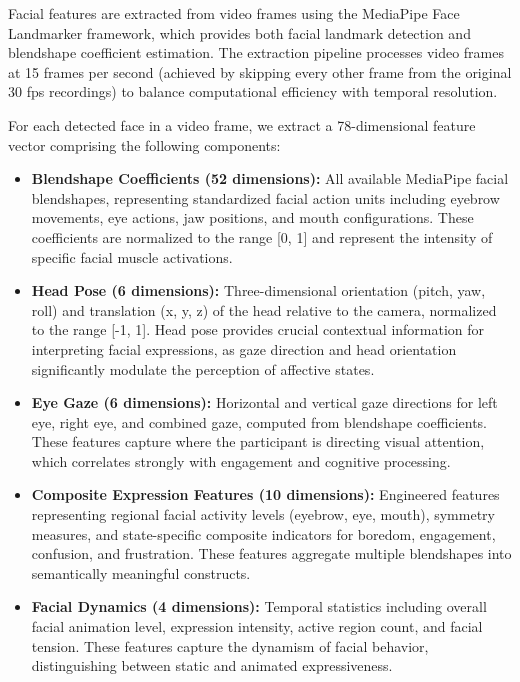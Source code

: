 \documentclass[11pt,a4paper]{article}
\begin{document}
Facial features are extracted from video frames using the MediaPipe Face Landmarker framework, which provides both facial landmark detection and blendshape coefficient estimation. The extraction pipeline processes video frames at 15 frames per second (achieved by skipping every other frame from the original 30 fps recordings) to balance computational efficiency with temporal resolution.

For each detected face in a video frame, we extract a 78-dimensional feature vector comprising the following components:

\begin{itemize}
  \item \textbf{Blendshape Coefficients (52 dimensions):} All available MediaPipe facial blendshapes, representing standardized facial action units including eyebrow movements, eye actions, jaw positions, and mouth configurations. These coefficients are normalized to the range [0, 1] and represent the intensity of specific facial muscle activations.

  \item \textbf{Head Pose (6 dimensions):} Three-dimensional orientation (pitch, yaw, roll) and translation (x, y, z) of the head relative to the camera, normalized to the range [-1, 1]. Head pose provides crucial contextual information for interpreting facial expressions, as gaze direction and head orientation significantly modulate the perception of affective states.

  \item \textbf{Eye Gaze (6 dimensions):} Horizontal and vertical gaze directions for left eye, right eye, and combined gaze, computed from blendshape coefficients. These features capture where the participant is directing visual attention, which correlates strongly with engagement and cognitive processing.

  \item \textbf{Composite Expression Features (10 dimensions):} Engineered features representing regional facial activity levels (eyebrow, eye, mouth), symmetry measures, and state-specific composite indicators for boredom, engagement, confusion, and frustration. These features aggregate multiple blendshapes into semantically meaningful constructs.

  \item \textbf{Facial Dynamics (4 dimensions):} Temporal statistics including overall facial animation level, expression intensity, active region count, and facial tension. These features capture the dynamism of facial behavior, distinguishing between static and animated expressiveness.
\end{itemize}
\end{document}
